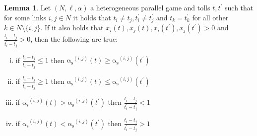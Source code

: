 \documentclass[10pt,a4paper]{book}
\newcommand{\as}{\mathrm{\alpha_s}}
\theoremstyle{definition}
\newtheorem{lemma}[definition]{Lemma}
\theoremstyle{comment}
\begin{document}
\begin{lemma}
	\label{lemma:split_monotonicity}
	Let $(N, \ell, \alpha)$ a heterogeneous parallel game and tolls $t, t^\prime$ such that for some links $i, j \in N$ it holds that $t_i \ne t_j, t_i^\prime \ne t_j^\prime$ and $t_k = t_k^\prime$ for all other $k \in N \setminus \{i, j\}$.
	If it also holds that $x_i(t), x_j(t), x_i(t^\prime), x_j(t^\prime) > 0$ and $\frac{t_i - t_j}{t_i^\prime - t_j^\prime} > 0$, then the following are true:
	\begin{enumerate}[(i)]
		\item if $\frac{t_i - t_j}{t_i^\prime - t_j^\prime} \le 1$ then $\as^{(i, j)}(t) \ge \as^{(i, j)}(t^\prime)$
		\item if $\frac{t_i - t_j}{t_i^\prime - t_j^\prime} \ge 1$ then $\as^{(i, j)}(t) \le \as^{(i, j)}(t^\prime)$
		\item if $\as^{(i, j)}(t) > \as^{(i, j)}(t^\prime)$ then $\frac{t_i - t_j}{t_i^\prime - t_j^\prime} < 1$
		\item if $\as^{(i, j)}(t) < \as^{(i, j)}(t^\prime)$ then $\frac{t_i - t_j}{t_i^\prime - t_j^\prime} > 1$
	\end{enumerate}
\end{lemma}
\end{document}

